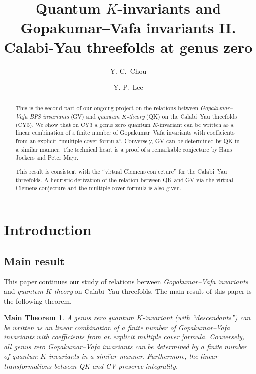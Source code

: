 \documentclass[11pt]{amsart}
\title[QK $=$ GV on CY3 II]{Quantum $K$-invariants and Gopakumar--Vafa invariants II. \\ Calabi-Yau threefolds at genus zero}
\author{Y.-C.~Chou}
\author{Y.-P.~Lee}
\newtheorem*{main theorem*}{Main Theorem}
\theoremstyle{remark}
\numberwithin{equation}{section}
\begin{document}
\maketitle

\begin{abstract}
This is the second part of our ongoing project on the relations between \emph{Gopakumar--Vafa BPS invariants} (GV) and \emph{quantum $K$-theory} (QK) on the Calabi--Yau threefolds (CY3). 
We show that on CY3 a genus zero quantum $K$-invariant can be written as a linear combination of a finite number of Gopakumar--Vafa invariants with coefficients from an explicit ``multiple cover formula''. Conversely, GV can be determined by QK in a similar manner. The technical heart is a proof of a remarkable conjecture by Hans Jockers and Peter Mayr.

This result is consistent with the ``virtual Clemens conjecture'' for the Calabi--Yau threefolds. A heuristic derivation of the relation between QK and GV via the virtual Clemens conjecture and the multiple cover formula is also given.
\end{abstract}

\tableofcontents

\setcounter{section}{-1}

\section{Introduction}

\subsection{Main result}
This paper continues our study of relations between \emph{Gopakumar--Vafa invariants} \cite{Gopakumar_Vafa_1998} and \emph{quantum $K$-theory} \cite{Givental_2000, Lee_2004} on Calabi--Yau threefolds. 
The main result of this paper is the following theorem.

\begin{main theorem*}
A genus zero quantum $K$-invariant (with ``descendants'') can be written as an linear combination of a finite number of Gopakumar--Vafa invariants with coefficients from an explicit multiple cover formula. Conversely, all genus zero Gopakumar--Vafa invariants can be determined by a finite number of quantum $K$-invariants in a similar manner. Furthermore, the linear transformations between QK and GV preserve integrality.
\end{main theorem*}
\end{document}
